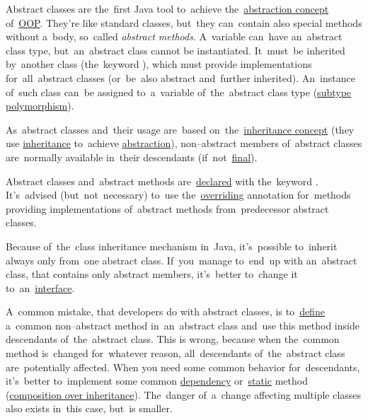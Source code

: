 
\label{javaabstractclasses}
Abstract classes are the~first Java tool to~achieve the~\hyperref[abstraction]{abstraction concept} of~\hyperref[objectorientedprogramming]{OOP}.
They're like standard classes, but~they can~contain also special methods without a~body, so~called \textit{abstract methods}.
A~variable can~have an~abstract class type, but~an~abstract class cannot be instantiated.
It~must~be inherited by~another class (the~keyword ), which must provide implementations for~all~abstract classes (or~be~also abstract and~further inherited).
An~instance of~such class can~be assigned to~a~variable of~the~abstract class type (\hyperref[polymorphism]{subtype polymorphism}).

As~abstract classes and~their usage are~based on~the~\hyperref[inheritance]{inheritance concept} (they use \hyperref[inheritance]{inheritance} to~achieve \hyperref[abstraction]{abstraction}), \mbox{non--abstract} members of~abstract classes are~normally available in~their descendants (if~not~\hyperref[javafinal]{final}).

Abstract classes and~abstract methods are~\hyperref[declarationdefinition]{declared} with the~keyword .
It's~advised (but~not~necessary) to~use the~\hyperref[javaoverride]{overriding} annotation for~methods providing implementations of~abstract methods from~predecessor abstract classes.

Because of~the~class inheritance mechanism in~Java, it's~possible to~inherit always only from~one abstract class.
If~you~manage to~end~up with an~abstract class, that contains only abstract members, it's~better to~change it to~an~\hyperref[javainterfaces]{interface}.

\enlargethispage{20mm}
\thispagestyle{empty}
A~common mistake, that developers do with abstract classes, is to~\hyperref[declarationdefinition]{define} a~common \mbox{non--abstract} method in~an~abstract class and~use this method inside descendants of~the~abstract class.
This is wrong, because when the~common method is~changed for~whatever reason, all~descendants of~the~abstract class are~potentially affected.
When you need some common behavior for~descendants, it's~better to~implement some common \hyperref[dependencyinjection]{dependency} or~\hyperref[javastatic]{static} method (\hyperref[compositionoverinheritance]{composition over inheritance}).
The~danger of~a~change affecting multiple classes also exists in~this case, but~is smaller.

